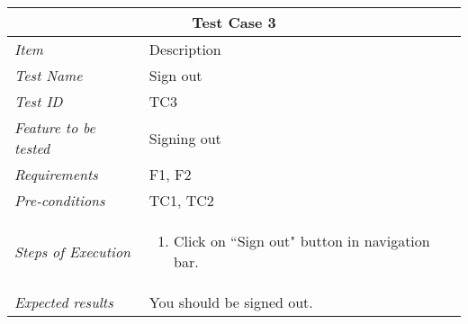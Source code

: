 \begin{minipage}{\linewidth}
\setlength{\tabcolsep}{15pt}
\centering
{}
\begin{tabular}{ |l|p{70mm}| }
	\hline
	\multicolumn{2}{|c|}{\cellcolor{gray!25} \textbf{Test Case 3}} \\
	\hline
	\it{\cellcolor{gray!25}Item} & {\cellcolor{gray!25} Description } \\
	\hline
	\it{\cellcolor{gray!25}Test Name } & Sign out \\ \hline
	\it{\cellcolor{gray!25}Test ID} & TC3 \\ \hline
	\it{\cellcolor{gray!25}Feature to be tested} & Signing out \\ \hline
	\it{\cellcolor{gray!25}Requirements} & F1, F2  \\ \hline
	\it{\cellcolor{gray!25}Pre-conditions} & TC1, TC2  \\ \hline
	\it{\cellcolor{gray!25}Steps of Execution} & \begin{enumerate}
	                                       \item Click on ``Sign out" button in navigation bar.
	                                     \end{enumerate} \\ \hline
	\it{\cellcolor{gray!25}Expected results} & You should be signed out. \\
	\hline
\end{tabular}
\medskip
\end{minipage}
%
